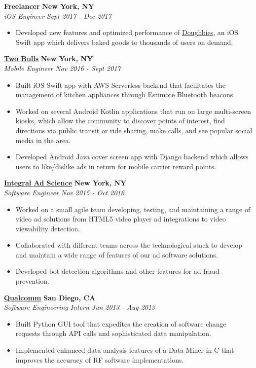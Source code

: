 \documentclass{res}
\begin{document}
\begin{resume}
{\bf Freelancer} \hfill {\bf New York, NY} \\
{\textit {iOS Engineer}} \hfill {\textit {Sept 2017 - Dec 2017}} 
\begin{itemize}
\itemsep -2pt  
\item Developed new features and optimized performance of \href{https://www.doughbies.com}{Doughbies}, an iOS Swift app which delivers baked goods to thousands of users on demand.
\end{itemize}

\href{https://www.twobulls.com}{\bf Two Bulls} \hfill {\bf New York, NY} \\
{\textit {Mobile Engineer}} \hfill {\textit {Nov 2016 - Sept 2017}} 
\begin{itemize}
\itemsep -2pt  
\item Built iOS Swift app with AWS Serverless backend that facilitates the management of kitchen appliances through Estimote Bluetooth beacons. 
\item Worked on several Android Kotlin applications that run on large multi-screen kiosks, which allow the community to discover points of interest, find directions via public transit or ride sharing, make calls, and see popular social media in the area. 
\item Developed Android Java cover screen app with Django backend which allows users to like/dislike ads in return for mobile carrier reward points.

\end{itemize}

\href{https://integralads.com}{\bf Integral Ad Science} \hfill {\bf New York, NY} \\
{\textit {Software Engineer}} \hfill {\textit {Nov 2015 - Oct 2016}} 
\begin{itemize}
\itemsep -2pt  
\item Worked on a small agile team developing, testing, and maintaining a range of video ad solutions from HTML5 video player ad integrations to video viewability detection.
\item Collaborated with different teams across the technological stack to develop and maintain a wide range of features of our ad software solutions.
\item Developed bot detection algorithms and other features for ad fraud prevention.

\end{itemize}

\href{https://www.qualcomm.com}{\bf Qualcomm} \hfill {\bf San Diego, CA} \\
{\textit {Software Engineering Intern}} \hfill {\textit {Jun 2013 - Aug 2013}} 
\begin{itemize} 
\itemsep -2pt  
\item Built Python GUI tool that expedites the creation of software 
	change requests through API calls and sophisticated data manipulation.
\item Implemented enhanced data analysis features of a Data Miner in C that
	 improves the accuracy of RF software implementations.
\end{itemize}


\end{resume}
\end{document}
